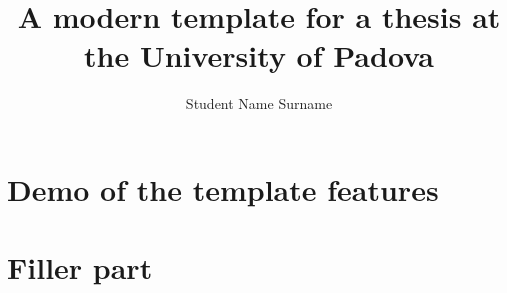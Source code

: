 \documentclass{unipd-thesis-modern} %
\title{A modern template for a thesis at\\ the University of Padova}
\author{Student Name Surname}
\begin{document}
    \frontmatter

    \mainmatter

    
    \glsresetall  %


    \part{\label{prt:demo}Demo of the template features} %

    


    \part{\label{prt:filler}Filler part}
    
    


    

    \begin{appendices}
        
    \end{appendices}

    \backmatter
\end{document}
